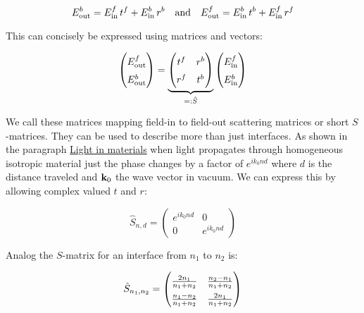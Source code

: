 \begin{equation}
    E^b_\s{out} = E^f_\s{in} \, t^f + E^b_\s{in} \, r^b
    \qq{and}
    E^f_\s{out} = E^b_\s{in} \, t^b + E^f_\s{in} \, r^f
\end{equation}

This can concisely be expressed using matrices and vectors:

\begin{equation}
\begin{pmatrix}
    E^f_\s{out} \\
    E^b_\s{out}
\end{pmatrix} =
\underbrace{
\begin{pmatrix}
    t^f & r^b \\
    r^f & t^b
\end{pmatrix}
}_{
 =: \hat{S}
}
\begin{pmatrix}
    E^f_\s{in} \\
    E^b_\s{in}
\end{pmatrix}
\end{equation}

We call these matrices mapping field-in to field-out scattering matrices or short $S$-matrices. They can be used to describe more than just interfaces. As shown in the paragraph \hyperref[par:light_in_materials]{Light in materials} when light propagates through homogeneous isotropic material just the phase changes by a factor of $e^{i k_0 n d}$ where $d$ is the distance traveled and $\vb k_0$ the wave vector in vacuum. We can express this by allowing complex valued $t$ and $r$:

\begin{equation}
    \hat S_{n, d} =
    \begin{pmatrix}
        e^{i k_0 n d} & 0 \\
        0 & e^{i k_0 n d}
    \end{pmatrix}
\end{equation}

Analog the $S$-matrix for an interface from $n_1$ to $n_2$ is:

\begin{equation}
    \hat S_{n_1, n_2} =
    \begingroup
    \renewcommand*{\arraystretch}{1.5}
        \begin{pmatrix}
            \frac{2 n_1}{n_1 + n_2} & \frac{n_2 - n_1}{n_1 + n_2} \\
            \frac{n_1 - n_2}{n_1 + n_2} & \frac{2 n_1}{n_1 + n_2}
        \end{pmatrix}
    \endgroup
\end{equation}
\\


